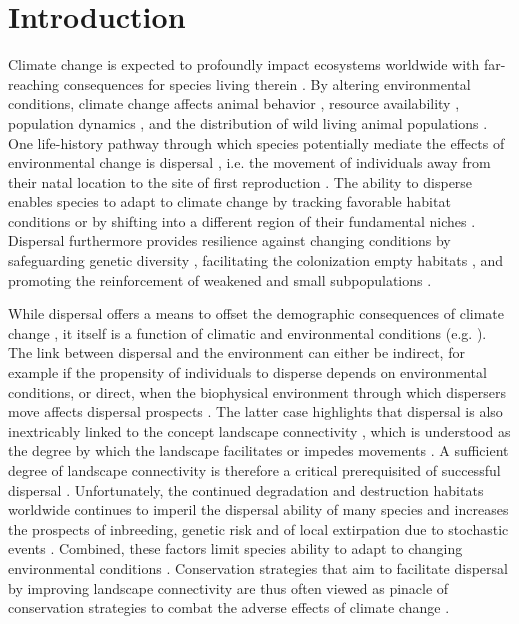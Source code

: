 \documentclass[abstract=on,10pt,a4paper,bibliography=totocnumbered]{article}
\begin{document}
\onehalfspacing
\tableofcontents
\doublespacing

\newpage
{}


\section{Introduction}
Climate change is expected to profoundly impact ecosystems worldwide with
far-reaching consequences for species living therein \citep{Ozgul.2010,
Radchuk.2019, IPCC.2022}. By altering environmental conditions, climate change
affects animal behavior \citep{Fuller.2016}, resource availability
\citep{Durant.2007}, population dynamics \citep{Paniw.2021}, and the
distribution of wild living animal populations \citep{Thomas.2004,
Thuiller.2006}. One life-history pathway through which species potentially
mediate the effects of environmental change is dispersal \citep{Anderson.2012},
i.e. the movement of individuals away from their natal location to the site of
first reproduction \citep{Clobert.2012}. The ability to disperse enables species
to adapt to climate change by tracking favorable habitat conditions
\citep{Raia.2012} or by shifting into a different region of their fundamental
niches \citep{Kokko.2022}. Dispersal furthermore provides resilience against
changing conditions by safeguarding genetic diversity \citep{Frankham.2002,
Leigh.2012, Baguette.2013}, facilitating the colonization empty habitats
\citep{Gustafson.1996, Hanski.1999b, MacArthur.2001}, and promoting the
reinforcement of weakened and small subpopulations \citep{Brown.1977}.

While dispersal offers a means to offset the demographic consequences of climate
change \citep{Kokko.2006, Hodgson.2009, Travis.2013}, it itself is a function of
climatic and environmental conditions (e.g. \citep{Elliot.2014, Behr.2020}). The
link between dispersal and the environment can either be indirect, for example
if the propensity of individuals to disperse depends on environmental
conditions, or direct, when the biophysical environment through which dispersers
move affects dispersal prospects \citep{Travis.2013}. The latter case highlights
that dispersal is also inextricably linked to the concept landscape connectivity
\citep{Baguette.2013}, which is understood as the degree by which the landscape
facilitates or impedes movements \citep{Taylor.1993}. A sufficient degree of
landscape connectivity is therefore a critical prerequisited of successful
dispersal \citep{Fahrig.2003}. Unfortunately, the continued degradation and
destruction habitats worldwide continues to imperil the dispersal ability of
many species and increases the prospects of inbreeding, genetic risk and of
local extirpation due to stochastic events \citep{Melbourne.2008, Sawyer.2011}.
Combined, these factors limit species ability to adapt to changing environmental
conditions \citep{Fahrig.2003}. Conservation strategies that aim to facilitate
dispersal by improving landscape connectivity are thus often viewed as pinacle
of conservation strategies to combat the adverse effects of climate change
\citep{Heller.2009}.
\end{document}
